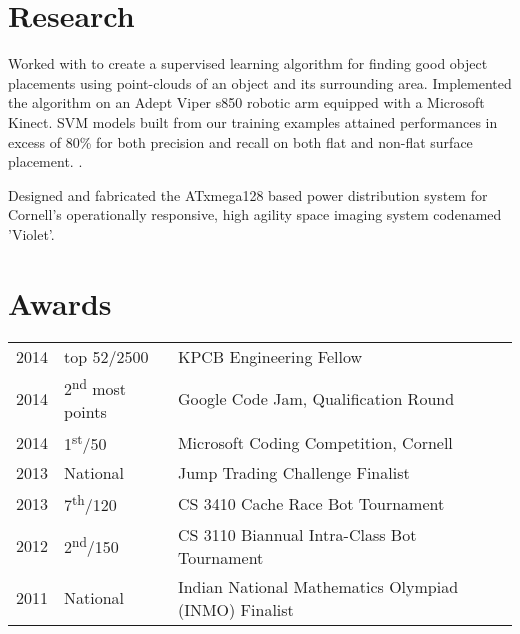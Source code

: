 \documentclass[]{deedy-resume-openfont}
\begin{document}
\begin{minipage}[t]{0.66\textwidth}
    \section{Research}
            Worked with  to create a supervised learning algorithm
            for finding good object placements using point-clouds of an object
            and its surrounding area. Implemented the algorithm on an Adept
            Viper s850 robotic arm equipped with a Microsoft Kinect. SVM models
            built from our training examples attained performances in excess of
            80\% for both precision and recall on both flat and non-flat
            surface placement.
            .
        \sectionsep

            Designed and fabricated the ATxmega128 based power distribution
            system for Cornell’s operationally responsive, high agility space
            imaging system codenamed 'Violet'.
    \sectionsep

    \section{Awards}
        \begin{tabular}{rll}
            2014 & top 52/2500  & KPCB Engineering Fellow\\
            2014 & 2\textsuperscript{nd} most points  & Google Code Jam, Qualification Round\\
            2014 & 1\textsuperscript{st}/50  & Microsoft Coding Competition, Cornell\\
            2013 & National  & Jump Trading Challenge Finalist\\
            2013 & 7\textsuperscript{th}/120 & CS 3410 Cache Race Bot Tournament  \\
            2012 & 2\textsuperscript{nd}/150 & CS 3110 Biannual Intra-Class Bot Tournament \\
            2011 & National & Indian National Mathematics Olympiad (INMO) Finalist \\
        \end{tabular}
    \sectionsep


\end{minipage}
\end{document}
